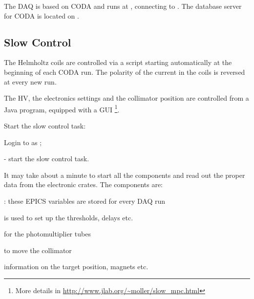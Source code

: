 {The DAQ%
 is based on CODA\cite{CODAwww} and runs at ,
connecting to . The database server for CODA
is located on . 

\subsection {Slow Control}
\label{sec:moller_compon_slow}

The Helmholtz coils are controlled via a script starting automatically
at the beginning of each CODA run. The polarity of the current in the coils
is reversed at every new run.

The HV, the electronics settings and the collimator position
are controlled from a Java program, equipped with a GUI%
\footnote{More details in \url{http://www.jlab.org/~moller/slow_mpc.html}}.

 Start the slow control task:
 \begin{list}{--}{\setlength{\itemsep}{-0.15cm}}
   \item Login to  as ;
   \item {}
   \item {} - start the slow control task.
 \end{list}
 It may take about a minute to start all the components and read out
 the proper data from the electronic crates.
 The components are: 
 \begin{list}{--}{\setlength{\itemsep}{-0.15cm}}
   \item {}: these EPICS variables are stored for every DAQ run
   \item {} is used to set up the thresholds, delays etc.
   \item {} for the photomultiplier tubes
   \item {} to move the collimator
   \item {} information on the target position, magnets etc.
 \end{list}
\infolevtwo{

}}
